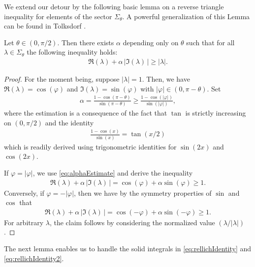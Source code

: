 We extend our detour by the following basic lemma on a reverse triangle inequality for elements of the sector $\Sigma_\theta$.
A powerful generalization of this Lemma can be found in Tolksdorf \cite[Lem.\@~5.2.4]{tolksdorf}.

\begin{lem}
  \label{lem:lambdaIneq}
  Let $\theta \in (0,\pi/2)$.
  Then there exists $\alpha$ depending only on $\theta$ such that for all $\lambda \in \Sigma_\theta$ the following inequality holds:
  \begin{align*}
    \Re(\lambda) + \alpha \, \big|\Im(\lambda)\,\big| \geq |\lambda|.
  \end{align*}
\end{lem}

\begin{proof}
  For the moment being, suppose $|\lambda| = 1$.
  Then, we have $\Re(\lambda) = \cos(\varphi)$ and $\Im(\lambda) = \sin(\varphi)$ with $|\varphi| \in (0, \pi - \theta)$. 
  Set
  \begin{align}
    \label{eq:alphaEstimate}
    \alpha = \frac{1 - \cos(\pi - \theta)}{\sin(\pi - \theta)} \geq \frac{1 - \cos(|\varphi|)}{\sin(|\varphi|)},
  \end{align}
  where the estimation is a consequence of the fact that $\tan$ is strictly increasing on $(0, \pi/2)$ and the identity 
  \begin{align*}
    \frac{1 - \cos(x)}{\sin(x)} = \tan(x/2)
  \end{align*}
  which is readily derived using trigonometric identities for $\sin(2x)$ and $\cos(2x)$.

  If $\varphi = |\varphi|$, we use \eqref{eq:alphaEstimate} and derive the inequality
  \begin{align*}
    \Re(\lambda) + \alpha \, |\Im(\lambda)\,| = \cos(\varphi) + \alpha \sin(\varphi) \geq 1.
  \end{align*}
  Conversely, if $\varphi = -|\varphi|$, then we have by the symmetry properties of $\sin$ and $\cos$ that
  \begin{align*}
    \Re(\lambda) + \alpha\, |\Im(\lambda)\,| = \cos(-\varphi) + \alpha \sin(-\varphi) \geq 1.
  \end{align*}
  For arbitrary $\lambda$, the claim follows by considering the normalized value $(\lambda / |\lambda|)$.
\end{proof}

The next lemma enables us to handle the solid integrals in \eqref{eq:rellichIdentity} and \eqref{eq:rellichIdentity2}.

